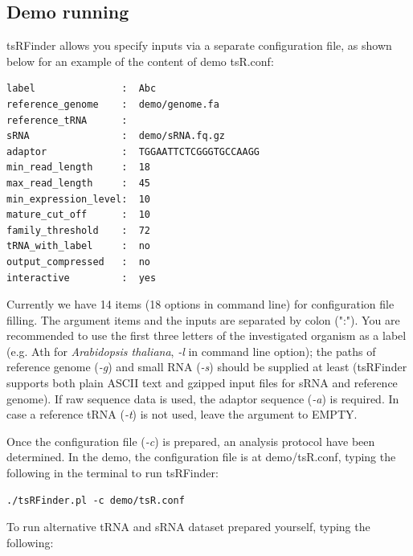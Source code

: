\documentclass[11pt, a4paper]{article}
\begin{document}
\subsection{Demo running}

tsRFinder allows you specify inputs via a separate configuration file, as shown below for an example of the content of demo tsR.conf:

{\footnotesize \begin{tcolorbox}[colback=blue!5!white,colframe=pink!75!black,title=Demo configuration file for tsRFinder: demo/tsR.conf]
\begin{verbatim}
label               :  Abc
reference_genome    :  demo/genome.fa
reference_tRNA      :
sRNA                :  demo/sRNA.fq.gz
adaptor             :  TGGAATTCTCGGGTGCCAAGG
min_read_length     :  18
max_read_length     :  45
min_expression_level:  10
mature_cut_off      :  10
family_threshold    :  72
tRNA_with_label     :  no
output_compressed   :  no
interactive         :  yes
\end{verbatim}
\end{tcolorbox}}

Currently we have 14 items (18 options in command line) for configuration file filling. The argument items and the inputs are separated by colon (":"). You are recommended to use the first three letters of the investigated organism as a label (e.g. Ath for \textit{Arabidopsis thaliana}, \emph{-l} in command line option); the paths of reference genome (\emph{-g}) and small RNA (\emph{-s}) should be supplied at least (tsRFinder supports both plain ASCII text and gzipped input files for sRNA and reference genome). If raw sequence data is used, the adaptor sequence (\emph{-a}) is required. In case a reference tRNA (\emph{-t}) is not used, leave the argument to EMPTY.

Once the configuration file (\emph{-c}) is prepared, an analysis protocol have been determined. In the demo, the configuration file is at demo/tsR.conf, typing the following in the terminal to run tsRFinder:

{\footnotesize \begin{tcolorbox}[colback=blue!5!white,colframe=pink!75!black,title=Running tsRFinder demo]
\begin{verbatim}
./tsRFinder.pl -c demo/tsR.conf
\end{verbatim}
\end{tcolorbox}}

To run alternative tRNA and sRNA dataset prepared yourself, typing the following:
\end{document}
